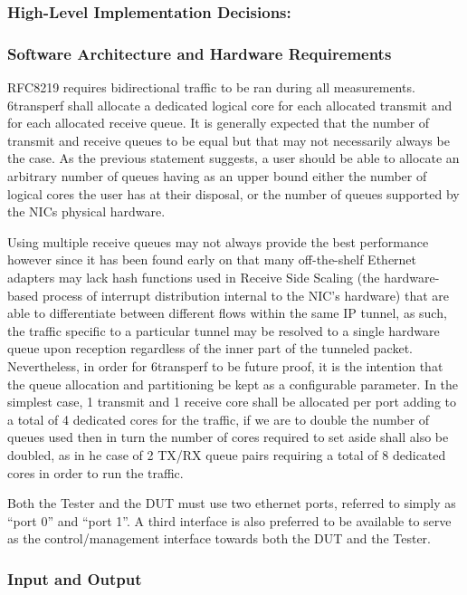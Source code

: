 \documentclass[a4paper,12p]{article}
\begin{document}
\subsubsection{High-Level Implementation Decisions:}
\subsubsection{Software Architecture and Hardware Requirements}

RFC8219 requires bidirectional traffic to be ran during all measurements. 6transperf shall allocate a dedicated logical core for each allocated transmit and for each allocated receive queue. It is generally expected that the number of transmit and receive queues to be equal but that may not necessarily always be the case. As the previous statement suggests, a user should be able to allocate an arbitrary number of queues having as an upper bound either the number of logical cores the user has at their disposal, or the number of queues supported by the NICs physical hardware.

Using multiple receive queues may not always provide the best performance however since it has been found early on that many off-the-shelf Ethernet adapters may lack hash functions used in Receive Side Scaling (the hardware-based process of interrupt distribution internal to the NIC’s hardware) that are able to differentiate between different flows within the same IP tunnel, as such, the traffic specific to a particular tunnel may be resolved to a single hardware queue upon reception regardless of the inner part of the tunneled packet. Nevertheless, in order for 6transperf to be future proof, it is the intention that the queue allocation and partitioning be kept as a configurable parameter. In the simplest case, 1 transmit and 1 receive core shall be allocated per port adding to a total of 4 dedicated cores for the traffic, if we are to double the number of queues used then in turn the number of cores required to set aside shall also be doubled, as in he case of 2 TX/RX queue pairs requiring a total of 8 dedicated cores in order to run the traffic.

Both the Tester and the DUT must use two ethernet ports, referred to simply as “port 0” and “port 1”. A third interface is also preferred to be available to serve as the control/management interface towards both the DUT and the Tester.

\subsubsection{Input and Output}
\end{document}
